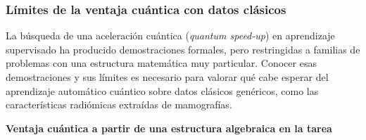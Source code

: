 
\subsubsection{Límites de la ventaja cuántica con datos clásicos}
\label{sec:limites_ventaja}

La búsqueda de una aceleración cuántica (\textit{quantum speed-up}) en aprendizaje supervisado ha producido demostraciones formales, pero restringidas a familias de problemas con una estructura matemática muy particular. Conocer esas demostraciones y sus límites es necesario para valorar qué cabe esperar del aprendizaje automático cuántico sobre datos clásicos genéricos, como las características radiómicas extraídas de mamografías.

\textbf{Ventaja cuántica a partir de una estructura algebraica en la tarea}

